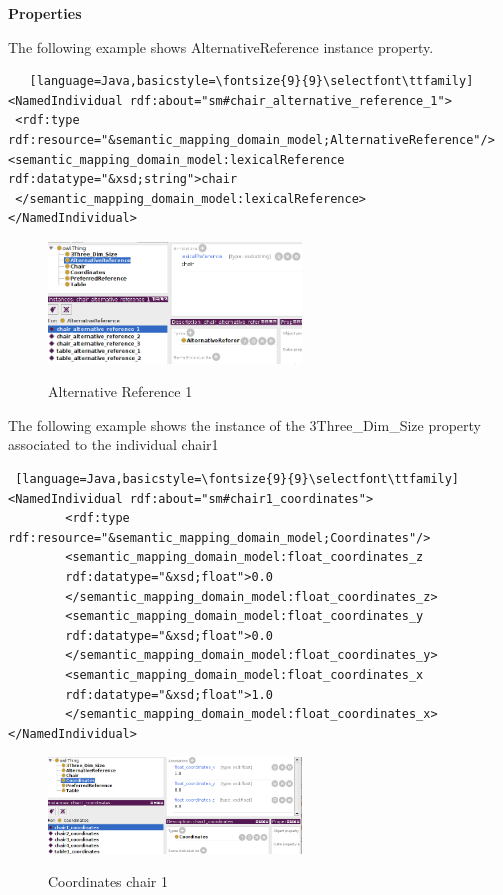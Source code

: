 \textbf{Properties}

The following example shows AlternativeReference instance property.
\begin{lstlisting}   [language=Java,basicstyle=\fontsize{9}{9}\selectfont\ttfamily] 
<NamedIndividual rdf:about="sm#chair_alternative_reference_1">
 <rdf:type rdf:resource="&semantic_mapping_domain_model;AlternativeReference"/>  <semantic_mapping_domain_model:lexicalReference rdf:datatype="&xsd;string">chair
 </semantic_mapping_domain_model:lexicalReference>
</NamedIndividual>
\end{lstlisting}


\begin{figure}[H]
\centering
\includegraphics[width=0.6\textwidth]{imgs/refChair1.png}
\label{fig:datatypes}
\caption{Alternative Reference 1}
\end{figure}

The following example shows the instance of the 3Three\_Dim\_Size property associated to the individual chair1
\begin{lstlisting} [language=Java,basicstyle=\fontsize{9}{9}\selectfont\ttfamily]   
<NamedIndividual rdf:about="sm#chair1_coordinates">
        <rdf:type rdf:resource="&semantic_mapping_domain_model;Coordinates"/>
        <semantic_mapping_domain_model:float_coordinates_z 
        rdf:datatype="&xsd;float">0.0
        </semantic_mapping_domain_model:float_coordinates_z>
        <semantic_mapping_domain_model:float_coordinates_y 
        rdf:datatype="&xsd;float">0.0
        </semantic_mapping_domain_model:float_coordinates_y>
        <semantic_mapping_domain_model:float_coordinates_x 
        rdf:datatype="&xsd;float">1.0
        </semantic_mapping_domain_model:float_coordinates_x>
</NamedIndividual>
\end{lstlisting}



\begin{figure}[H]
\centering
\includegraphics[width=0.6\textwidth]{imgs/coordchair1.png}
\label{fig:datatypes}
\caption{Coordinates chair 1}
\end{figure}
